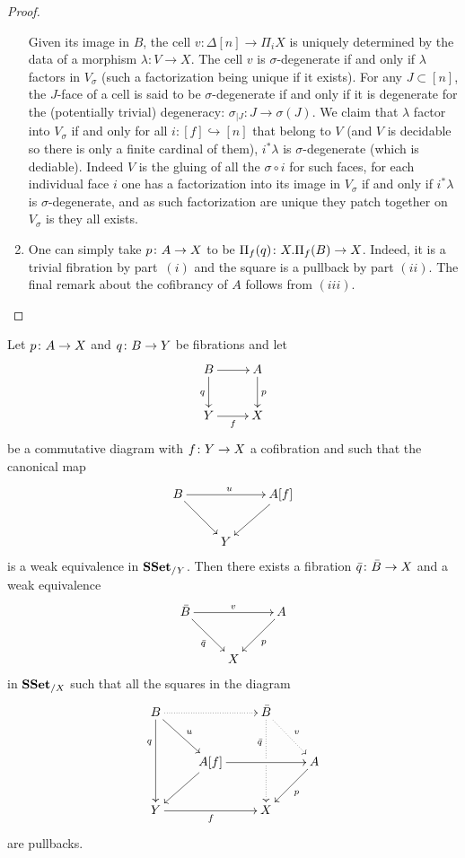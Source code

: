 \documentclass[reqno,10pt,a4paper,oneside,draft]{amsart}
\begin{document}
\begin{proof}
\begin{enumerate}[$(i)$]
Given its image in $B$, the cell $v: \Delta[n] \rightarrow \Pi_i X$ is uniquely determined by the data of a morphism $\lambda: V\rightarrow X$. The cell $v$ is $\sigma$-degenerate if and only if $\lambda$ factors in $V_{\sigma}$ (such a factorization being unique if it exists). For any $J \subset [n]$, the $J$-face of a cell is said to be $\sigma$-degenerate if and only if it is degenerate for the (potentially trivial) degeneracy: $\sigma_{|J} : J \rightarrow \sigma(J)$. We claim that $\lambda$ factor into $V_{\sigma}$ if and only for all $i:[f] \hookrightarrow [n]$ that belong to $V$ (and $V$ is decidable so there is only a finite cardinal of them), $i^* \lambda$ is $\sigma$-degenerate (which is dediable). Indeed $V$ is the gluing of all the $\sigma \circ i$ for such faces, for each individual face $i$ one has a factorization into its image in $V_{\sigma}$ if and only if $i^* \lambda$ is $\sigma$-degenerate, and as such factorization are unique they patch together on $V_{\sigma}$ is they all exists.

\item One can simply take $p \colon A \to X$ to be $\Pi_f(q) \colon X.\Pi_f(B) \to X$. Indeed, it is a trivial fibration by part~$(i)$ and the square is a pullback by part $(ii)$. The final remark about the cofibrancy of 
$A$ follows from $(iii)$. \qedhere
\end{enumerate}
\end{proof}





\begin{proposition}
\label{Prop:Homotopy_ext_prop}
Let $p \colon A \to X$ and $q \colon B \to Y$ be fibrations and let
\[
\xymatrix{
B \ar[r] \ar[d]_q & A \ar[d]^p \\
Y \ar[r]_f & X}
\]
be a commutative diagram with $f \colon Y \to X$ a cofibration and such that the canonical map
\begin{equation}
\label{equ:gluedata}
\begin{gathered}
\xymatrix{
B \ar[rr]^{u} \ar[dr] &  & A[f] \ar[dl] \\
 & Y &}
 \end{gathered}
 \end{equation}
is a weak equivalence in $\mathbf{SSet}_{/ Y}$. Then there exists a fibration $\bar{q} \colon \bar{B} \to X$ and a weak equivalence
\[
\xymatrix{
\bar{B} \ar[rr]^{v} \ar[dr]_{\bar{q}} &  & A \ar[dl]^{p} \\
 & X &}
 \]
 in $\mathbf{SSet}_{/X}$ such that all the squares in the diagram
\[ 
\xymatrix{
 B
  \ar@{.>}[rr]
  \ar[dr]^{u}
  \ar[dd]_(.3){q}
&&
  \bar{B}
  \ar@{.>}[dr]^{v}
  \ar@{.>}[dd]_(.3){\bar{q}}|{\hole}
&\\&
  A[f] 
  \ar[rr]
  \ar[dl]
&&
  A
  \ar[dl]^{p}
\\
  Y
  \ar[rr]_{f}
&&
  X
&
}
\]
are pullbacks. 
\end{proposition}
\end{document}
